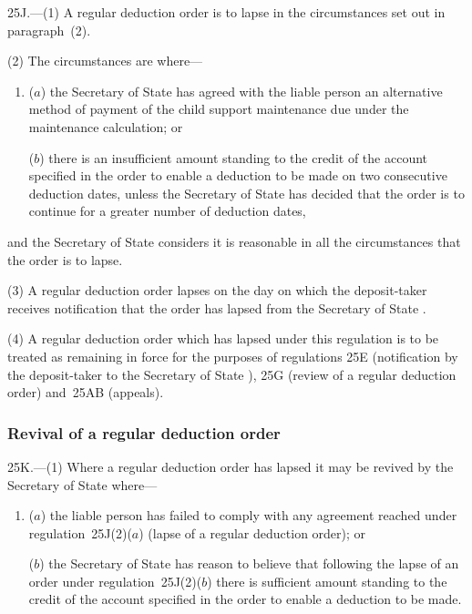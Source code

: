 \documentclass[12pt,a4paper]{article}
\begin{document}
25J.---(1)  A regular deduction order is to lapse in the circumstances set out in  paragraph~(2).

(2) The circumstances are where—
\begin{enumerate}\item[]
($a$) the 
Secretary of State  %
has agreed with the liable person an alternative method of payment of the child support maintenance due under the maintenance calculation; or

($b$) there is an insufficient amount standing to the credit of the account specified in the order to enable a deduction to be made on two consecutive deduction dates, unless the 
Secretary of State  %
has decided that the order is to continue for a greater number of deduction dates,
\end{enumerate}
and the 
Secretary of State  %
considers it is reasonable in all the circumstances that the order is to lapse.

(3) A regular deduction order lapses on the day on which the deposit-taker receives notification that the order has lapsed from the 
Secretary of State%
.

(4) A regular deduction order which has lapsed under this regulation is to be treated as remaining in force for the purposes of regulations 25E (notification by the deposit-taker to the 
Secretary of State%
), 25G (review of a regular deduction order) and~25AB (appeals).


\subsubsection[25K. Revival of a regular deduction order]{Revival of a regular deduction order}

25K.---(1)  Where a regular deduction order has lapsed it may be revived by the 
Secretary of State  %
where—
\begin{enumerate}\item[]
($a$) the liable person has failed to comply with any agreement reached under regulation~25J(2)($a$)  (lapse of a regular deduction order); or

($b$) the 
Secretary of State  %
has reason to believe that following the lapse of an order under regulation~25J(2)($b$)  there is sufficient amount standing to the credit of the account specified in the order to enable a deduction to be made.
\end{enumerate}
\end{document}
